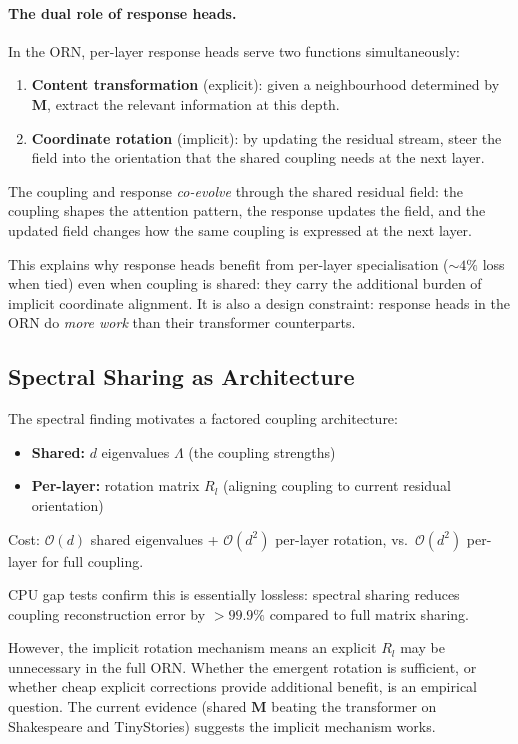 \documentclass[11pt, a4paper]{article}
\newcommand{\M}{\mathbf{M}}
\newcommand{\bigO}{\mathcal{O}}
\theoremstyle{remark}
\begin{document}
\paragraph{The dual role of response heads.}
In the ORN, per-layer response heads serve two functions simultaneously:
\begin{enumerate}[nosep]
    \item \textbf{Content transformation} (explicit): given a neighbourhood determined by $\M$, extract the relevant information at this depth.
    \item \textbf{Coordinate rotation} (implicit): by updating the residual stream, steer the field into the orientation that the shared coupling needs at the next layer.
\end{enumerate}

The coupling and response \emph{co-evolve} through the shared residual field: the coupling shapes the attention pattern, the response updates the field, and the updated field changes how the same coupling is expressed at the next layer.

This explains why response heads benefit from per-layer specialisation (${\sim}4\%$ loss when tied) even when coupling is shared: they carry the additional burden of implicit coordinate alignment.
It is also a design constraint: response heads in the ORN do \emph{more work} than their transformer counterparts.

\subsection{Spectral Sharing as Architecture}

The spectral finding motivates a factored coupling architecture:
\begin{itemize}[nosep]
    \item \textbf{Shared:} $d$ eigenvalues $\Lambda$ (the coupling strengths)
    \item \textbf{Per-layer:} rotation matrix $R_l$ (aligning coupling to current residual orientation)
\end{itemize}
Cost: $\bigO(d)$ shared eigenvalues + $\bigO(d^2)$ per-layer rotation, vs.\ $\bigO(d^2)$ per-layer for full coupling.

CPU gap tests confirm this is essentially lossless: spectral sharing reduces coupling reconstruction error by $>99.9\%$ compared to full matrix sharing.

However, the implicit rotation mechanism means an explicit $R_l$ may be unnecessary in the full ORN.
Whether the emergent rotation is sufficient, or whether cheap explicit corrections provide additional benefit, is an empirical question.
The current evidence (shared $\M$ beating the transformer on Shakespeare and TinyStories) suggests the implicit mechanism works.
\end{document}
